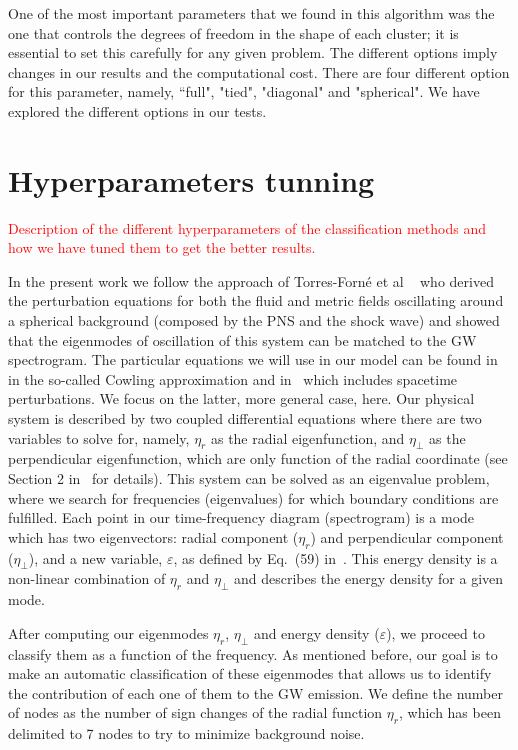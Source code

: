 \documentclass[fleqn,usenatbib]{mnras}
\begin{document}
One of the most important parameters that we found in this algorithm was the one that controls the degrees of freedom in the shape of each cluster; it is essential to set this carefully for any given problem. The different options imply changes in our results and the computational cost. There are four different option for this parameter, namely, ``full", "tied", "diagonal"  and "spherical". We have explored the different options in our tests.

\section{Hyperparameters tunning}

\textcolor{red}{Description of the different hyperparameters of the classification methods and how we have tuned them to get the better results.} 

In the present work we follow the approach of Torres-Forné et al ~\cite{} who derived the perturbation equations for both the fluid and metric fields oscillating around a spherical background (composed by the PNS and the shock wave) and showed that the eigenmodes of oscillation of this system can be matched to the GW spectrogram. The particular equations we will use in our model can be found in~\cite{} in the so-called Cowling approximation and in~\cite{} which includes spacetime perturbations. We focus on the latter, more general case, here. Our physical system is described by two coupled differential equations where there are two variables to solve for, namely, $\eta_r$ as the radial eigenfunction, and $\eta_\bot$ as the perpendicular eigenfunction, which are only function of the radial coordinate (see Section 2 in~\cite{nocowling} for details). This system can be solved as an eigenvalue problem, where we search for frequencies (eigenvalues) for which boundary conditions are  fulfilled. Each point in our time-frequency diagram (spectrogram) is a mode which has two eigenvectors: radial component ($\eta_r$) and perpendicular component ($\eta_\bot$), and a new variable, $\varepsilon$, as defined by Eq.~(59) in~\cite{nocowling}. This energy density is a non-linear combination of $\eta_r$ and $\eta_\bot$ and describes the energy density for a given mode.

After computing our eigenmodes $\eta_r$, $\eta_\bot$ and energy density ($\varepsilon$), we proceed to classify them as a function of the frequency. As mentioned before, our goal is to make an automatic  classification of these eigenmodes that allows us to identify the contribution of each one of them to the GW emission. We define the number of nodes as the number of sign changes of the radial function $\eta_r$, which has been delimited to 7 nodes to try to minimize background noise.
\end{document}
